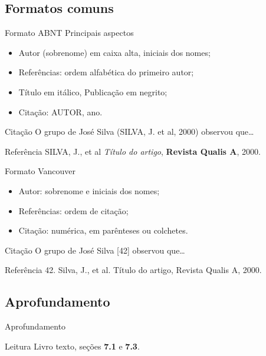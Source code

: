 \documentclass{beamer}
\begin{document}
\subsection{Formatos comuns}

\begin{frame}{Formato ABNT}
  Principais aspectos
  \begin{itemize}
    \footnotesize
  \item Autor (sobrenome) em caixa alta, iniciais dos nomes;
  \item Referências: ordem alfabética do primeiro autor;
  \item Título em itálico, Publicação em negrito;
  \item Citação: AUTOR, ano.
  \end{itemize}
  \begin{exampleblock}{Citação}
    \footnotesize
    O grupo de José Silva (SILVA, J. et al, 2000) observou que\ldots
  \end{exampleblock}
  \begin{exampleblock}{Referência}
    \footnotesize
    SILVA, J., et al {\em Título do artigo}, {\bf Revista Qualis A},
    2000.
  \end{exampleblock}
\end{frame}

\begin{frame}{Formato Vancouver}
  \begin{itemize}
    \footnotesize
  \item Autor: sobrenome e iniciais dos nomes;
  \item Referências: ordem de citação;
  \item Citação: numérica, em parênteses ou colchetes.
  \end{itemize}
  \begin{exampleblock}{Citação}
    \footnotesize
    O grupo de José Silva [42] observou que\ldots
  \end{exampleblock}
  \begin{exampleblock}{Referência}
    \footnotesize
    42. Silva, J., et al. Título do artigo, Revista Qualis A, 2000.
  \end{exampleblock}
\end{frame}

\subsection{Aprofundamento}

\begin{frame}{Aprofundamento}
  \begin{block}{Leitura}
    Livro texto, seções {\bf 7.1} e {\bf 7.3}.
  \end{block}
\end{frame}
\end{document}
